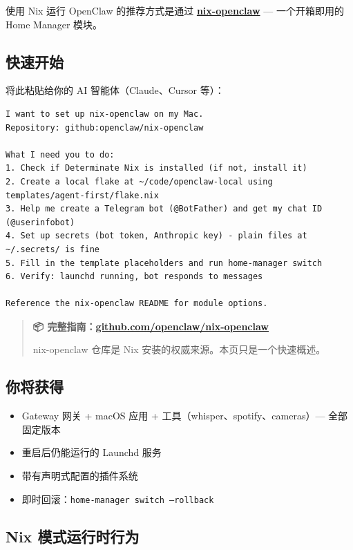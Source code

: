 使用 Nix 运行 OpenClaw 的推荐方式是通过 \textbf{\href{https://github.com/openclaw/nix-openclaw}{nix-openclaw}} — 一个开箱即用的 Home Manager 模块。

\subsection{快速开始}


将此粘贴给你的 AI 智能体（Claude、Cursor 等）：

\begin{lstlisting}
I want to set up nix-openclaw on my Mac.
Repository: github:openclaw/nix-openclaw

What I need you to do:
1. Check if Determinate Nix is installed (if not, install it)
2. Create a local flake at ~/code/openclaw-local using templates/agent-first/flake.nix
3. Help me create a Telegram bot (@BotFather) and get my chat ID (@userinfobot)
4. Set up secrets (bot token, Anthropic key) - plain files at ~/.secrets/ is fine
5. Fill in the template placeholders and run home-manager switch
6. Verify: launchd running, bot responds to messages

Reference the nix-openclaw README for module options.
\end{lstlisting}


\begin{quote}
\textbf{📦 完整指南：\href{https://github.com/openclaw/nix-openclaw}{github.com/openclaw/nix-openclaw}}

nix-openclaw 仓库是 Nix 安装的权威来源。本页只是一个快速概述。
\end{quote}


\subsection{你将获得}


\begin{itemize}
  \item Gateway 网关 + macOS 应用 + 工具（whisper、spotify、cameras）— 全部固定版本
  \item 重启后仍能运行的 Launchd 服务
  \item 带有声明式配置的插件系统
  \item 即时回滚：\texttt{home-manager switch --rollback}
\end{itemize}


\hrulefill


\subsection{Nix 模式运行时行为}


